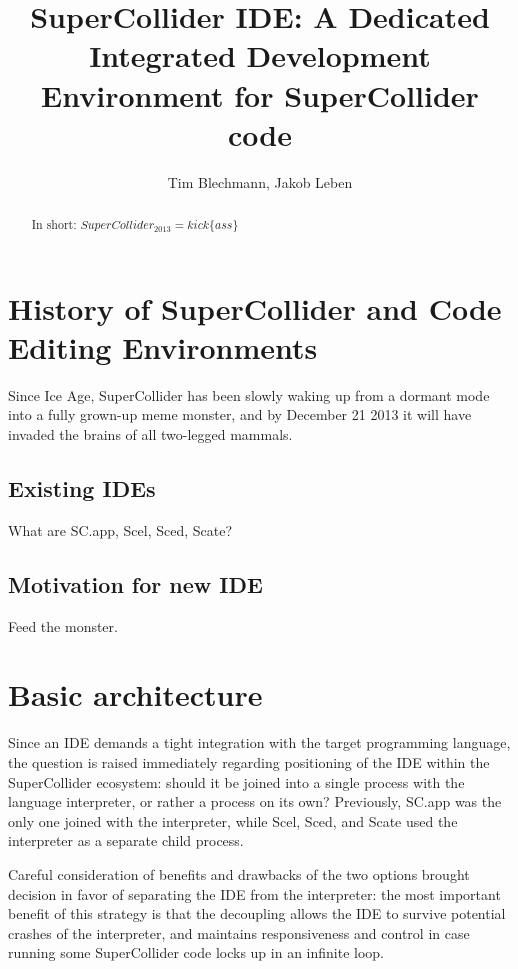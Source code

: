 \documentclass[a4paper,10pt]{article}
\title{SuperCollider IDE: A Dedicated Integrated Development Environment for SuperCollider code}
\author{Tim Blechmann, Jakob Leben}
\begin{document}
\maketitle

\begin{abstract}
In short: $SuperCollider_{2013} = kick\{ass\}$
\end{abstract}

\section{History of SuperCollider and Code Editing Environments}

Since Ice Age, SuperCollider has been slowly waking up from a dormant mode into a fully grown-up
meme monster, and by December 21 2013 it will have invaded the brains of all two-legged mammals.

\subsection{Existing IDEs}

What are SC.app, Scel, Sced, Scate?

\subsection{Motivation for new IDE}

Feed the monster.

\section{Basic architecture}

Since an IDE demands a tight integration with the target programming language, the question is
raised immediately regarding positioning of the IDE within the SuperCollider ecosystem: should it be
joined into a single process with the language interpreter, or rather a process on its own?
Previously, SC.app was the only one joined with the interpreter, while Scel, Sced, and Scate used
the interpreter as a separate child process.

Careful consideration of benefits and drawbacks of the two options brought decision in favor of
separating the IDE from the interpreter: the most important benefit of this strategy is that the
decoupling allows the IDE to survive potential crashes of the interpreter, and maintains
responsiveness and control in case running some SuperCollider code locks up in an infinite loop.
\end{document}
